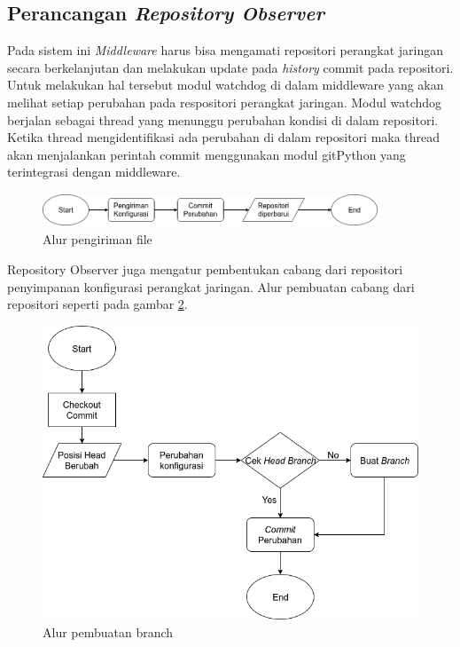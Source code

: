         \subsection{Perancangan \textit{Repository Observer}}
            Pada sistem ini \textit{Middleware} harus bisa mengamati repositori perangkat jaringan secara berkelanjutan dan melakukan update pada \textit{history} commit pada repositori. Untuk melakukan hal tersebut modul watchdog di dalam middleware yang akan melihat setiap perubahan pada respositori perangkat jaringan. Modul watchdog berjalan sebagai thread yang menunggu perubahan kondisi di dalam repositori. Ketika thread mengidentifikasi ada perubahan di dalam repositori maka thread akan menjalankan perintah commit menggunakan modul gitPython yang terintegrasi dengan middleware.
            \begin{figure}[H]
            	\centering
            	\includegraphics[width=10cm,height=1cm]{Images/C-3/AlurPengirimanFile.png}
            	\caption{Alur pengiriman file}
            	\label{desain:pengiriman file}
            \end{figure}
	        \indent Repository Observer juga mengatur pembentukan cabang dari repositori penyimpanan konfigurasi perangkat jaringan. Alur pembuatan cabang dari repositori seperti pada gambar \ref{CreateBranch}.
	        \begin{figure}[H]
	        	\centering
	        	\includegraphics[width=\textwidth]{Images/C-3/CreateBranch.png}
	        	\caption{Alur pembuatan branch}
	        	\label{CreateBranch}
	        \end{figure}
        
